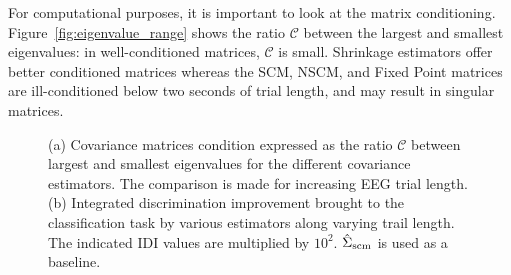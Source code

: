 For computational purposes, it is important to look at the matrix conditioning. 
Figure~\ref{fig:eigenvalue_range} shows the ratio $\mathcal{C}$ between the largest and smallest eigenvalues: in well-conditioned matrices, $\mathcal{C}$ is small. 
Shrinkage estimators offer better conditioned matrices whereas the SCM, NSCM, and Fixed Point matrices are ill-conditioned below two seconds of trial length, and may result in singular matrices. 

%        
%        


\begin{figure}[htb!]
\centering
{}
\caption{(a) Covariance matrices condition expressed as the ratio $\mathcal{C}$ between largest and smallest eigenvalues for the different covariance estimators. The comparison is made for increasing EEG trial length. (b) Integrated discrimination improvement brought to the classification task by various estimators along varying trail length. The indicated IDI values are multiplied by $10^{2}$. $\hat{\Sigma}_{\operatorname{scm}}$ is used as a baseline. } 
\label{fig:class_idi}
\end{figure} 



